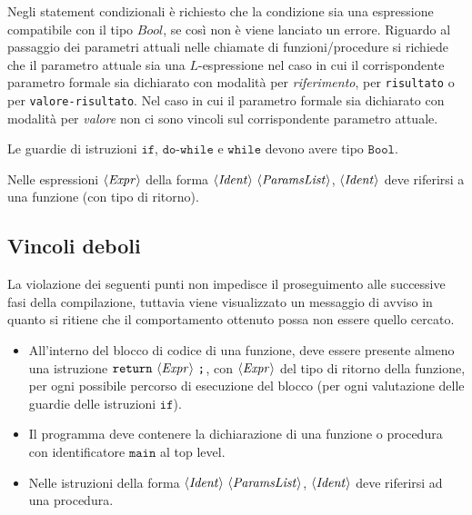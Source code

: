 Negli statement condizionali è richiesto che la condizione sia una espressione compatibile con il tipo $Bool$, se così non è viene lanciato un errore.
Riguardo al passaggio dei parametri attuali nelle chiamate di funzioni/procedure si richiede che il parametro attuale sia una $L$-espressione nel caso in cui il corrispondente parametro formale sia dichiarato con modalità per \textit{riferimento}, per \texttt{risultato} o per \texttt{valore-risultato}. Nel caso in cui il parametro formale sia dichiarato con modalità per \textit{valore} non ci sono vincoli sul corrispondente parametro attuale.




Le guardie di istruzioni $\texttt{if}$, $\texttt{do-while}$ e $\texttt{while}$ devono avere tipo $\texttt{Bool}$.

Nelle espressioni $\langle \mathit{Expr} \rangle$ della forma $\token{Ident}\ \token{ParamsList}$, $\langle \mathit{Ident} \rangle$ deve riferirsi a una funzione (con tipo di ritorno).

\subsection*{Vincoli deboli}
La violazione dei seguenti punti non impedisce il proseguimento alle successive fasi della compilazione, tuttavia viene visualizzato un messaggio di avviso in quanto si ritiene che il comportamento ottenuto possa non essere quello cercato.

\begin{itemize}
	\item All'interno del blocco di codice di una funzione, deve essere presente almeno una istruzione $\texttt{return}\ \langle \mathit{Expr} \rangle\ \texttt{;}$, con $\langle \mathit{Expr} \rangle$ del tipo di ritorno della funzione, per ogni possibile percorso di esecuzione del blocco (per ogni valutazione delle guardie delle istruzioni $\texttt{if}$).
	\item Il programma deve contenere la dichiarazione di una funzione o procedura con identificatore $\texttt{main}$ al top level.
	\item Nelle istruzioni della forma $\token{Ident}\ \token{ParamsList}$, $\langle \mathit{Ident} \rangle$ deve riferirsi ad una procedura.
\end{itemize}